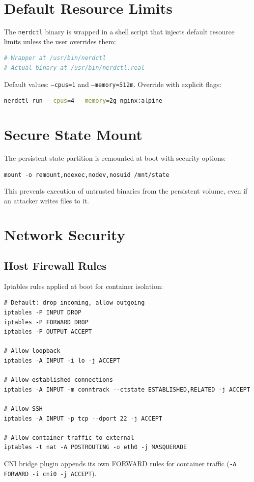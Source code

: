 \section{Default Resource Limits}

The \texttt{nerdctl} binary is wrapped in a shell script that injects
default resource limits unless the user overrides them:

\begin{lstlisting}[language=bash]
# Wrapper at /usr/bin/nerdctl
# Actual binary at /usr/bin/nerdctl.real
\end{lstlisting}

Default values: \texttt{--cpus=1} and \texttt{--memory=512m}. Override
with explicit flags:

\begin{lstlisting}[language=bash]
nerdctl run --cpus=4 --memory=2g nginx:alpine
\end{lstlisting}

\section{Secure State Mount}

The persistent state partition is remounted at boot with security
options:

\begin{lstlisting}
mount -o remount,noexec,nodev,nosuid /mnt/state
\end{lstlisting}

This prevents execution of untrusted binaries from the persistent
volume, even if an attacker writes files to it.

\section{Network Security}

\subsection{Host Firewall Rules}

Iptables rules applied at boot for container isolation:

\begin{lstlisting}
# Default: drop incoming, allow outgoing
iptables -P INPUT DROP
iptables -P FORWARD DROP
iptables -P OUTPUT ACCEPT

# Allow loopback
iptables -A INPUT -i lo -j ACCEPT

# Allow established connections
iptables -A INPUT -m conntrack --ctstate ESTABLISHED,RELATED -j ACCEPT

# Allow SSH
iptables -A INPUT -p tcp --dport 22 -j ACCEPT

# Allow container traffic to external
iptables -t nat -A POSTROUTING -o eth0 -j MASQUERADE
\end{lstlisting}

CNI bridge plugin appends its own FORWARD rules for container traffic
(\texttt{-A FORWARD -i cni0 -j ACCEPT}).
